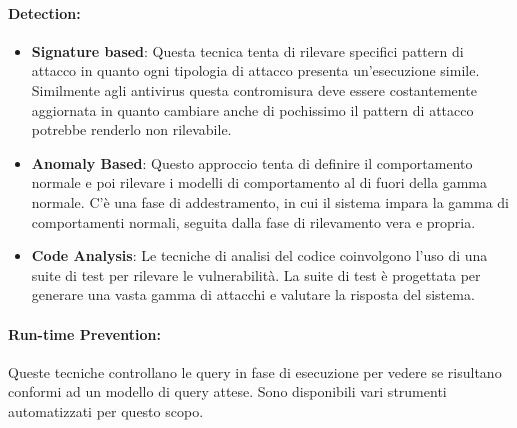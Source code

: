 \paragraph{Detection:}
\begin{itemize}
      \item \textbf{Signature based}: Questa tecnica tenta di rilevare specifici
            pattern di attacco in quanto ogni tipologia di attacco presenta
            un'esecuzione simile. Similmente agli antivirus questa contromisura
            deve essere costantemente aggiornata in quanto cambiare anche di pochissimo
            il pattern di attacco potrebbe renderlo non rilevabile.
      \item \textbf{Anomaly Based}: Questo approccio tenta di definire il
            comportamento normale e poi rilevare i modelli di comportamento al
            di fuori della gamma normale. C'è una fase di
            addestramento, in cui il sistema impara la gamma di comportamenti
            normali, seguita dalla fase di rilevamento vera e propria.
      \item \textbf{Code Analysis}: Le tecniche di analisi del
            codice coinvolgono l'uso di una suite di test per rilevare le
            vulnerabilità. La suite di test è progettata per generare una
            vasta gamma di attacchi e valutare la risposta del sistema.
\end{itemize}

\paragraph{Run-time Prevention:}
Queste tecniche controllano le query in fase di esecuzione per vedere se risultano
conformi ad un modello di query attese. Sono disponibili vari strumenti
automatizzati per questo scopo.
